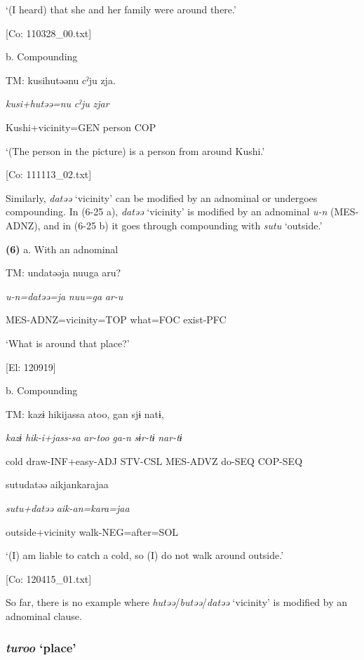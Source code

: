       ‘(I heard) that she and her family were around there.’

      [Co: 110328\_00.txt]

  b.  Compounding

    TM:  kusihutəənu  cˀju  zja.

      \textit{kusi+hutəə=nu}  \textit{cˀju}  \textit{zjar}

      Kushi+vicinity=GEN  person  COP

      ‘(The person in the picture) is a person from around Kushi.’

      [Co: 111113\_02.txt]

Similarly, \textit{datəə} ‘vicinity’ can be modified by an adnominal or undergoes compounding. In (6-25 a), \textit{datəə} ‘vicinity’ is modified by an adnominal \textit{u-n} (MES-ADNZ), and in (6-25 b) it goes through compounding with \textit{sutu} ‘outside.’

\textbf{(6)}  a.  With an adnominal

    TM:  undatəəja  nuuga  aru?

      \textit{u-n=datəə=ja}  \textit{nuu=ga}  \textit{ar-u}

      MES-ADNZ=vicinity=TOP  what=FOC  exist-PFC

      ‘What is around that place?’

      [El: 120919]

  b.  Compounding

    TM:  kazɨ  hikijassa  atoo,  gan  sjɨ  natɨ,

      \textit{kazɨ}  \textit{hik-i+jass-sa}  \textit{ar-too}  \textit{ga-n}  \textit{sɨr-tɨ}  \textit{nar-tɨ}

      cold  draw-INF+easy-ADJ  STV-CSL  MES-ADVZ  do-SEQ  COP-SEQ

      sutudatəə  aikjankarajaa

      \textit{sutu+datəə}  \textit{aik-an=kara=jaa}

      outside+vicinity  walk-NEG=after=SOL

      ‘(I) am liable to catch a cold, so (I) do not walk around outside.’

      [Co: 120415\_01.txt]

So far, there is no example where \textit{hutəə}/\textit{butəə}/\textit{datəə} ‘vicinity’ is modified by an adnominal clause.

\subsubsection{ \textit{turoo} ‘place’}

